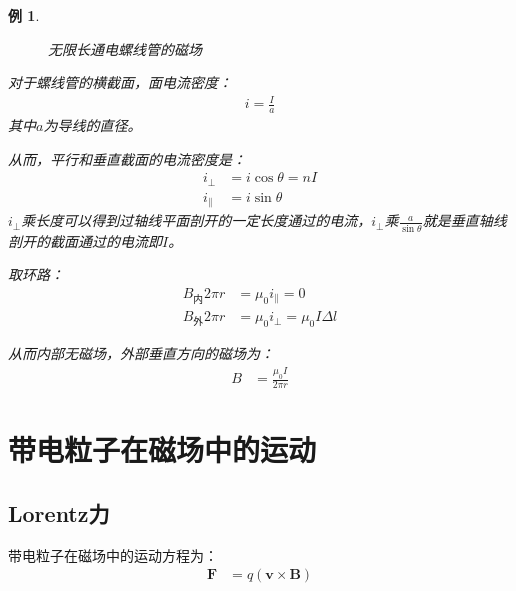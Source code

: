 \documentclass[12pt,onecolumn,a4paper]{book}
\newtheorem*{example}{例}
\numberwithin{table}{subsection}
\numberwithin{equation}{subsection}
\begin{document}
\begin{example}
\begin{figure}[ht]

        \caption{无限长通电螺线管的磁场}
    \end{figure}

    对于螺线管的横截面，面电流密度：
    \begin{align}
        i = \frac{I}{a}
    \end{align}
    其中$a$为导线的直径。

    从而，平行和垂直截面的电流密度是：
    \begin{align}
        i_{\perp}     & = i \cos \theta = nI \\
        i_{\parallel} & = i \sin \theta
    \end{align}
    $i_{\perp}$乘长度可以得到过轴线平面剖开的一定长度通过的电流，$i_{\perp}$乘$\frac{a}{\sin\theta}$就是垂直轴线剖开的截面通过的电流即$I$。

    取环路：
    \begin{align}
        B_\text{内} 2 \pi r & = \mu_0 i_{\parallel} = 0            \\
        B_\text{外} 2 \pi r & = \mu_0 i_{\perp} = \mu_0 I \Delta l
    \end{align}

    从而内部无磁场，外部垂直方向的磁场为：
    \begin{align}
        B & = \frac{\mu_0 I}{2\pi r}
    \end{align}

\end{example}


\section{带电粒子在磁场中的运动}

\subsection{Lorentz力}

带电粒子在磁场中的运动方程为：
\begin{align}
    \mathbf{F} & = q(\mathbf{v} \times \mathbf{B})
\end{align}
\end{document}
